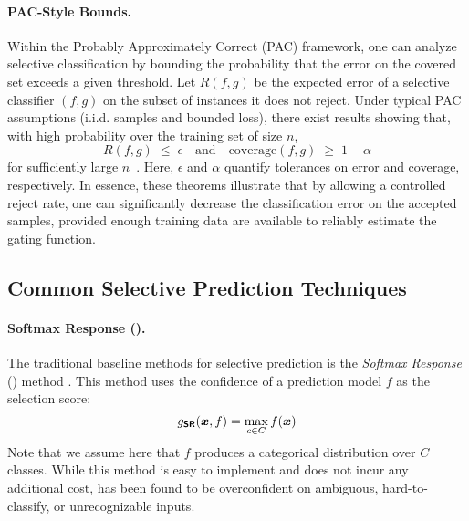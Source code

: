 \paragraph{PAC-Style Bounds.}
Within the Probably Approximately Correct (PAC) framework, one can analyze selective classification by bounding the probability that the error on the covered set exceeds a given threshold. Let $R(f,g)$ be the expected error of a selective classifier $(f,g)$ on the subset of instances it does not reject. Under typical PAC assumptions (i.i.d. samples and bounded loss), there exist results showing that, with high probability over the training set of size $n$,
\begin{equation}
R(f,g) \;\le\; \epsilon \quad \text{and} \quad \text{coverage}(f,g) \;\geq\; 1-\alpha
\end{equation}
for sufficiently large $n$~\citep{cortes2016learning}. Here, $\epsilon$ and $\alpha$ quantify tolerances on error and coverage, respectively. In essence, these theorems illustrate that by allowing a controlled reject rate, one can significantly decrease the classification error on the accepted samples, provided enough training data are available to reliably estimate the gating function.

\subsection{Common Selective Prediction Techniques}

\paragraph{Softmax Response (\sr).} The traditional baseline methods for selective prediction is the \emph{Softmax Response} (\sr) method \citep{hendrycks2016baseline, geifman2017selective}. This method uses the confidence of a prediction model $f$ as the selection score:
\begin{equation}
	g_{\textbf{\sffamily SR}}(\bm{x}, f) = \max_{c \in C} f(\bm{x})
\end{equation}
Note that we assume here that $f$ produces a categorical distribution over $C$ classes. While this method is easy to implement and does not incur any additional cost, \sr has been found to be overconfident on ambiguous, hard-to-classify, or unrecognizable inputs.

